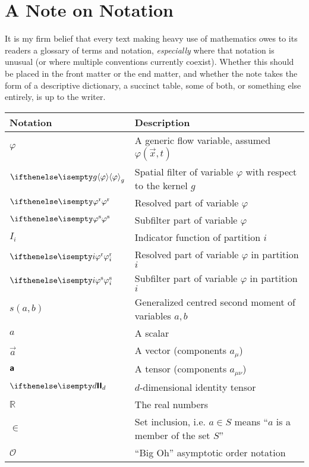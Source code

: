 \chapter{A Note on Notation}

It is my firm belief that every text making heavy use of mathematics owes to its readers a glossary of terms and notation, \textit{especially} where that notation is unusual (or where multiple conventions currently coexist).
Whether this should be placed in the front matter or the end matter, and whether the note takes the form of a descriptive dictionary, a succinct table, some of both, or something else entirely, is up to the writer.

\begin{table}[h]
    \centering
    \begin{tabularx}{\textwidth}{ l | L }
        \hline
        Notation    & Description   \\
        \hline
        $\varphi$               & A generic flow variable, assumed $\varphi(\vec{x},t)$ \\
        $\filter[g]{\varphi}$   & Spatial filter of variable $\varphi$ with respect to the kernel $g$  \\
        $\resolved{\varphi}$    & Resolved part of variable $\varphi$                   \\
        $\subfilter{\varphi}$   & Subfilter part of variable $\varphi$                  \\
        $I_i$                   & Indicator function of partition $i$                   \\
        $\resolved[i]{\varphi}$ & Resolved part of variable $\varphi$ in partition $i$  \\
        $\subfilter[i]{\varphi}$& Subfilter part of variable $\varphi$ in partition $i$ \\
        $s(a,b)$                & Generalized centred second moment of variables $a,b$  \\
        $a$                     & A scalar                                              \\
        $\vec{a}$               & A vector (components $a_\mu$)                         \\
        $\boldsymbol{\mathsf{a}}$            & A tensor (components $a_{\mu\nu}$)                    \\
        $\ident[d]$             & $d$-dimensional identity tensor                       \\
        $\mathbb{R}$            & The real numbers                                      \\
        $\in$                   & Set inclusion, i.e. $a \in S$ means ``$a$ is a member of the set $S$''    \\
        $\mathcal{O}$           & ``Big Oh'' asymptotic order notation                  \\
        \hline
    \end{tabularx}
\end{table}